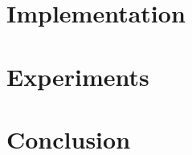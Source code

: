 \documentclass[12pt]{report}
\begin{document}










\chapter{Implementation}









\chapter{Experiments}





\chapter{Conclusion}







\end{document}
